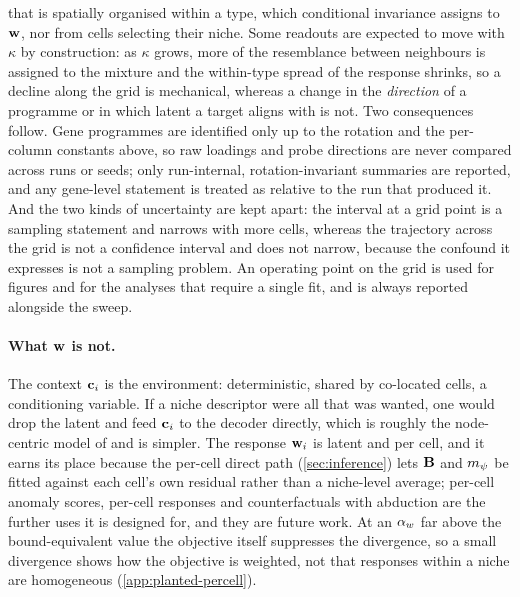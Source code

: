 that is spatially organised within a type, which conditional invariance assigns to $\mathbf{w}$, nor from cells selecting their niche. Some readouts are expected to move with $\kappa$ by construction: as $\kappa$ grows, more of the resemblance between neighbours is assigned to the mixture and the within-type spread of the response shrinks, so a decline along the grid is mechanical, whereas a change in the \emph{direction} of a programme or in which latent a target aligns with is not. Two consequences follow. Gene programmes are identified only up to the rotation and the per-column constants above, so raw loadings and probe directions are never compared across runs or seeds; only run-internal, rotation-invariant summaries are reported, and any gene-level statement is treated as relative to the run that produced it. And the two kinds of uncertainty are kept apart: the interval at a grid point is a sampling statement and narrows with more cells, whereas the trajectory across the grid is not a confidence interval and does not narrow, because the confound it expresses is not a sampling problem. An operating point on the grid is used for figures and for the analyses that require a single fit, and is always reported alongside the sweep.

\paragraph{What $\mathbf{w}$ is not.}
 The context $\mathbf{c}_i$ is the environment: deterministic, shared by co-located cells, a conditioning variable. If a niche descriptor were all that was wanted, one would drop the latent and feed $\mathbf{c}_i$ to the decoder directly, which is roughly the node-centric model of \citet{fischer2023} and is simpler. The response $\mathbf{w}_i$ is latent and per cell, and it earns its place because the per-cell direct path (\cref{sec:inference}) lets $\mathbf{B}$ and $m_{\psi}$ be fitted against each cell's own residual rather than a niche-level average; per-cell anomaly scores, per-cell responses and counterfactuals with abduction are the further uses it is designed for, and they are future work. At an $\alpha_w$ far above the bound-equivalent value the objective itself suppresses the divergence, so a small divergence shows how the objective is weighted, not that responses within a niche are homogeneous (\cref{app:planted-percell}).
